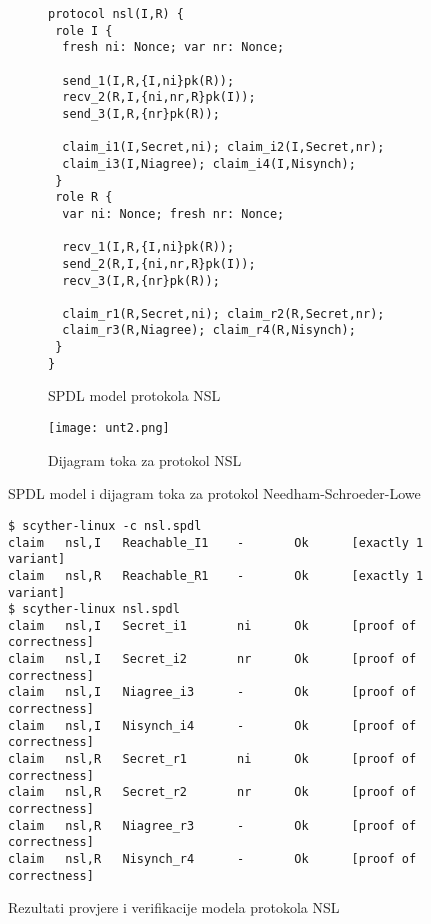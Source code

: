 \begin{figure}[H]
    \begin{subfigure}{0.58\textwidth}
\begin{small}
\begin{verbatim}
protocol nsl(I,R) {
 role I {
  fresh ni: Nonce; var nr: Nonce;

  send_1(I,R,{I,ni}pk(R));
  recv_2(R,I,{ni,nr,R}pk(I));
  send_3(I,R,{nr}pk(R));

  claim_i1(I,Secret,ni); claim_i2(I,Secret,nr);
  claim_i3(I,Niagree); claim_i4(I,Nisynch);
 }
 role R {
  var ni: Nonce; fresh nr: Nonce;

  recv_1(I,R,{I,ni}pk(R));
  send_2(R,I,{ni,nr,R}pk(I));
  recv_3(I,R,{nr}pk(R));

  claim_r1(R,Secret,ni); claim_r2(R,Secret,nr);
  claim_r3(R,Niagree); claim_r4(R,Nisynch);
 }
}
\end{verbatim}
\end{small}
\caption{SPDL model protokola NSL}
\label{fig:nsl_def_full}
\end{subfigure}
\begin{subfigure}{0.428\textwidth}
\begin{centering}
    \texttt{[image: unt2.png]}
    \vspace{9pt}
    \caption{Dijagram toka za protokol NSL}
    \label{fig:char_nsl}
\end{centering}
\end{subfigure}
\caption{SPDL model i dijagram toka za protokol Needham-Schroeder-Lowe}
\end{figure}

\begin{figure}[htb]
\begin{framed}
\begin{small}
\begin{verbatim}
$ scyther-linux -c nsl.spdl 
claim   nsl,I   Reachable_I1    -       Ok      [exactly 1 variant]
claim   nsl,R   Reachable_R1    -       Ok      [exactly 1 variant]
$ scyther-linux nsl.spdl 
claim   nsl,I   Secret_i1       ni      Ok      [proof of correctness]
claim   nsl,I   Secret_i2       nr      Ok      [proof of correctness]
claim   nsl,I   Niagree_i3      -       Ok      [proof of correctness]
claim   nsl,I   Nisynch_i4      -       Ok      [proof of correctness]
claim   nsl,R   Secret_r1       ni      Ok      [proof of correctness]
claim   nsl,R   Secret_r2       nr      Ok      [proof of correctness]
claim   nsl,R   Niagree_r3      -       Ok      [proof of correctness]
claim   nsl,R   Nisynch_r4      -       Ok      [proof of correctness]
\end{verbatim}
\end{small}
\vspace{-15pt}
\end{framed}
\caption{Rezultati provjere i verifikacije modela protokola NSL}
\label{fig:nsl_char}
\end{figure}

